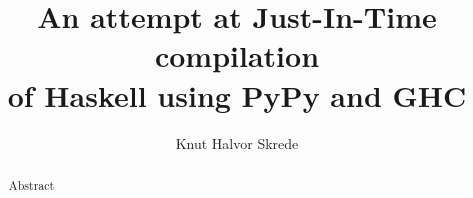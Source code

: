 \documentclass{article}
\begin{document}
\title{An attempt at Just-In-Time compilation\\of Haskell using PyPy and GHC}
\author{Knut Halvor Skrede}
\maketitle

\begin{abstract}
Abstract
\end{abstract}

\clearpage

\tableofcontents

\clearpage

\setlength\LTleft{0pt}
\setlength\LTright{0pt}





















\end{document}
